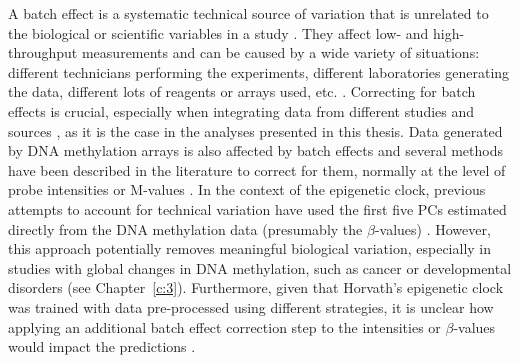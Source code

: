 \bigskip

A batch effect is a systematic technical source of variation that is unrelated to the biological or scientific variables in a study \cite{Leek2010}. They affect low- and high-throughput measurements and can be caused by a wide variety of situations: different technicians performing the experiments, different laboratories generating the data, different lots of reagents or arrays used, etc. \cite{Leek2010}. Correcting for batch effects is crucial, especially when integrating data from different studies and sources \cite{Maksimovic2015}, as it is the case in the analyses presented in this thesis. Data generated by DNA methylation arrays is also affected by batch effects and several methods have been described in the literature to correct for them, normally at the level of probe intensities \cite{Fortin2014} or M-values \cite{Maksimovic2015,Price2018}. In the context of the epigenetic clock, previous attempts to account for technical variation have used the first five \acrshort{PC}s estimated directly from the DNA methylation data (presumably the $\beta$-values) \cite{Horvath2016a}. However, this approach potentially removes meaningful biological variation, especially in studies with global changes in DNA methylation, such as cancer \cite{Fortin2014} or developmental disorders (see Chapter~\ref{c:3}). Furthermore, given that Horvath's epigenetic clock was trained with data pre-processed using different strategies, it is unclear how applying an additional batch effect correction step to the intensities or $\beta$-values would impact the predictions \cite{Horvath2013a}.

\bigskip

